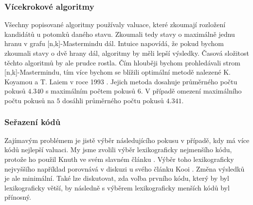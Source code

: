 \subsubsection{Vícekrokové algoritmy}
Všechny popisované algoritmy používaly valuace, které zkoumají rozložení kandidátů u potomků daného stavu. Zkoumali tedy stavy o maximálně jednu hranu v grafu [n,k]-Mastermindu dál. Intuice napovídá, že pokud bychom zkoumali stavy o dvě hrany dál, algoritmy by měli lepší výsledky. Časová složitost těchto algoritmů by ale prudce rostla. Čím hlouběji bychom prohledávali strom [n,k]-Mastermindu, tím více bychom se blížili optimální metodě nalezené K. Koyamou a T. Laiem v roce 1993 \cite{koyama}. Jejich metoda dosahuje průměrného počtu pokusů $4.340$ s maximálním počtem pokusů $6$. V případě omezení maximálního počtu pokusů na $5$ dosáhli průměrného počtu pokusů $4.341$. 


\subsubsection{Seřazení kódů}
Zajímavým problémem je jistě výběr následujícího pokusu v případě, kdy má více kódů nejlepší valuaci. My jsme zvolili výběr lexikograficky nejmenšího kódu, protože ho použil Knuth ve svém slavném článku \cite{donald_e__knuth_1977}. Výběr toho lexikograficky nejvyššího například porovnává v diskuzi u svého článku Kooi \cite{kooi}. Změna výsledků je ale minimální. Také lze diskutovat, zda volba prvního kódu, který by byl lexikograficky větší, by následně s výběrem lexikograficky menších kódů byl přínosný. 







